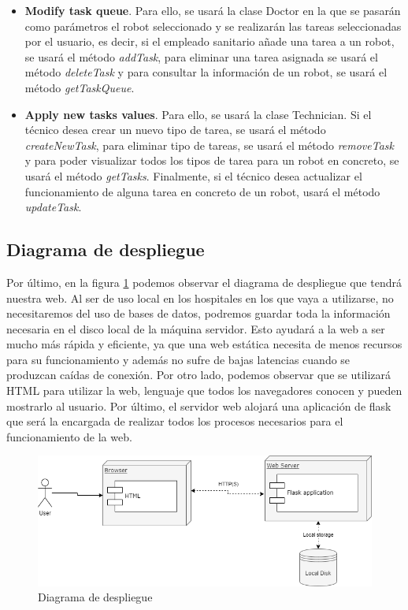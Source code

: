 \begin{itemize}
  \item \textbf{Modify task queue}. Para ello, se usará la clase Doctor en la que se pasarán como parámetros el robot seleccionado y se realizarán las tareas seleccionadas por el usuario, es decir, si el empleado sanitario añade una tarea a un robot, se usará el método \textit{addTask}, para eliminar una tarea asignada se usará el método \textit{deleteTask} y para consultar la información de un robot, se usará el método \textit{getTaskQueue}.
  
  \item \textbf{Apply new tasks values}. Para ello, se usará la clase Technician. Si el técnico desea crear un nuevo tipo de tarea, se usará el método \textit{createNewTask}, para eliminar tipo de tareas, se usará el método \textit{removeTask} y para poder visualizar todos los tipos de tarea para un robot en concreto, se usará el método \textit{getTasks}. Finalmente, si el técnico desea actualizar el funcionamiento de alguna tarea en concreto de un robot, usará el método \textit{updateTask}.
\end{itemize}

\subsection{Diagrama de despliegue}

Por último, en la figura \ref{fig:deploy} podemos observar el diagrama de despliegue que tendrá nuestra web. Al ser de uso local en los hospitales en los que vaya a utilizarse, no necesitaremos del uso de bases de datos, podremos guardar toda la información necesaria en el disco local de la máquina servidor. Esto ayudará a la web a ser mucho más rápida y eficiente, ya que una web estática necesita de menos recursos para su funcionamiento y además no sufre de bajas latencias cuando se produzcan caídas de conexión. Por otro lado, podemos observar que se utilizará HTML para utilizar la web, lenguaje que todos los navegadores conocen y pueden mostrarlo al usuario. Por último, el servidor web alojará una aplicación de flask que será la encargada de realizar todos los procesos necesarios para el funcionamiento de la web.

\begin{figure}[H]
	\centering
	\includegraphics[width=1\textwidth]{images/diagramaDespliegueWeb.png}
	\caption{Diagrama de despliegue}
	\label{fig:deploy}
\end{figure}

